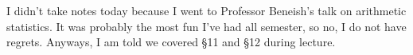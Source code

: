 \documentclass[../notes.tex]{subfiles}
\begin{document}
I didn't take notes today because I went to Professor Beneish's talk on arithmetic statistics. It was probably the most fun I've had all semester, so no, I do not have regrets. Anyways, I am told we covered \S11 and \S12 during lecture.
\end{document}
